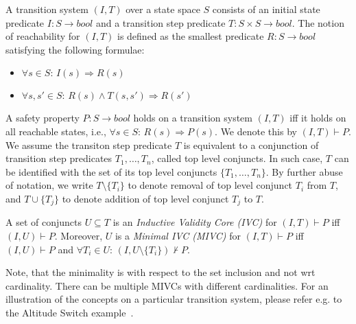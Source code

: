A transition system $(I,T)$ over a state space $S$ consists of an initial state predicate $I : S \rightarrow bool$ and a transition step predicate $T : S \times S \rightarrow bool$. The notion of reachability for $(I, T)$ is defined as the smallest predicate $R : S \rightarrow bool$ satisfying the following formulae:

\begin{itemize}
	\item[] $\forall s \in S: \, I(s) \Rightarrow R(s)$
	\item[] $\forall s, s' \in S: \, R(s) \wedge T(s, s') \Rightarrow R(s')$
\end{itemize}

A safety property $P: S \rightarrow bool$ holds on a transition system $(I, T)$ iff it holds on all reachable states, i.e., $\forall s \in S: \, R(s) \Rightarrow P(s)$. We denote this by $(I, T) \vdash P$. We assume
the transiton step predicate $T$ is equivalent to   a conjunction of transition step predicates $T_1, \ldots, T_n$,  called top level conjuncts.
In such case, $T$ can be identified with the set of its top level conjuncts $\{ T_1, \ldots, T_n\}$. By further abuse of notation, we write $T \setminus \{ T_i \}$ to denote removal of top level conjunct $T_i$ from $T$, and $T \cup \{ T_j\}$ to denote addition of top level conjunct $T_j$ to $T$.


\begin{definition}
A set of conjuncts $U \subseteq T$ is an \emph{ Inductive Validity Core (IVC)} for $(I, T) \vdash P$ iff $(I, U) \vdash P$. Moreover, $U$ is a \emph{Minimal IVC (MIVC)} for $(I, T) \vdash P$ iff $(I, U) \vdash P$ and $\forall T_i \in U: \, (I, U \setminus \{ T_i\}) \nvdash P$.
\end{definition}

Note, that the minimality is with respect to the set inclusion and not wrt cardinality. There can be multiple MIVCs with different cardinalities.
For an illustration of the concepts on a particular transition system, please refer e.g. to the Altitude Switch example~\cite{Ghass17AllIVCs}.




